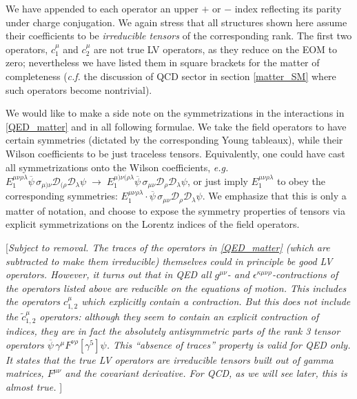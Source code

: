\documentclass[12pt]{revtex4}
\newcommand{\wt}{\widetilde}
\newcommand{\ov}{\overline}
\begin{document}
	We have appended to each operator an upper $+$ or $-$ index reflecting
	its parity under charge conjugation.
	We again stress that all structures shown here assume
	their coefficients to be {\it irreducible tensors} of the 
	corresponding rank. 
	The first two operators, $ c_1^\mu $ and $ c_2^\mu $ are not true
	LV operators, as they reduce on the EOM to zero; 
	nevertheless we have listed them in square brackets 
	for the matter of completeness
	({\it c.f.} the discussion of QCD sector in section \ref{matter_SM}
	where such operators become nontrivial).

	We would like to make a side note on the symmetrizations in the 
	interactions in \eqref{QED_matter} and in all following formulae.
	We take the field operators to have certain symmetries 
	(dictated by the corresponding Young tableaux), while their Wilson
	coefficients to be just traceless tensors. 
	Equivalently, one could have cast all symmetrizations onto the
	Wilson coefficients, {\it e.g.}
$	E_1^{\mu\nu\rho\lambda}
	\ov{\psi}\, \sigma_{\mu)\nu} \mathcal{D}_{(\rho}\mathcal{D}_\lambda 
	\psi 
	\;\to\;
	E_1^{\mu)\nu(\rho\lambda}
	\ov{\psi}\, \sigma_{\mu\nu} \mathcal{D}_{\rho}\mathcal{D}_\lambda 
	\psi $,
	or just imply $ E_1^{\mu\nu\rho\lambda} $ to obey the corresponding
	symmetries: 
$	E_1^{\mu\nu\rho\lambda}\cdot
	\ov{\psi}\, \sigma_{\mu\nu} \mathcal{D}_{\rho}\mathcal{D}_\lambda 
	\psi $.
	We emphasize that this is only a matter of notation, and choose
	to expose the symmetry properties of tensors via explicit 
	symmetrizations on the Lorentz indices of the field operators.

	[{\it Subject to removal. 
	The traces of the operators in \eqref{QED_matter} (which are subtracted
	to make them irreducible) themselves could in principle be
	good LV operators. 	
	However, it turns out that in QED all $ g^{\mu\nu} $- and
	$ \epsilon^{\kappa\mu\nu\rho} $-contractions of the operators 
	listed above are reducible on the equations of motion. 
	This includes the operators $ c_{1,2}^\mu $ which explicitly
	contain a contraction.
	But this does not
	include the $ \wt{c}_{1,2}^\mu $ operators: although they
	seem to contain an explicit contraction of indices, 
	they are
	in fact 
	the absolutely antisymmetric parts of the rank 3 tensor
	operators $ \ov{\psi}\, \gamma^\mu F^{\nu\rho} [\gamma^5] \psi $.
	This ``absence of traces'' property is valid for QED only.
	It states that the true LV operators are irreducible tensors
	built out of gamma matrices, $ F^{\mu\nu} $ and the covariant
	derivative.
	For QCD, as we will see later, this is almost true.
	}]
\end{document}
